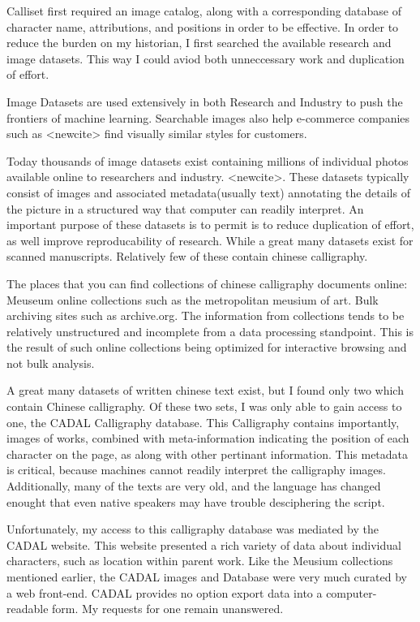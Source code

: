 
Calliset first required an image catalog, along with a corresponding database of character name, attributions, and positions in order to be effective.  In order to reduce the burden on my historian, I first searched the available research and image datasets.  This way I could aviod both unneccessary work and duplication of effort.

Image Datasets are used extensively in both Research and Industry to push the frontiers of machine learning.  Searchable images also help e-commerce companies such as <newcite> find visually similar styles for customers.

Today thousands of image datasets exist containing millions of individual photos available online to researchers and industry.  <newcite>.  These datasets typically consist of images and associated metadata(usually text) annotating the details of the picture in a structured way that computer can readily interpret.  An important purpose of these datasets is to permit is to reduce duplication of effort, as well improve reproducability of research.  While a great many datasets exist for scanned manuscripts.  Relatively few of these contain chinese calligraphy.

The places that you can find collections of chinese calligraphy documents online:  Meuseum online collections such as the metropolitan meusium of art.  Bulk archiving sites such as archive.org.  The information from collections tends to be relatively unstructured and incomplete from a data processing standpoint.  This is the result of such online collections being optimized for interactive browsing and not bulk analysis.

A great many datasets of written chinese text exist, but I found only two which contain Chinese calligraphy.  Of these two sets, I was only able to gain access to one, the CADAL Calligraphy database.  This Calligraphy contains importantly, images of works, combined with meta-information indicating the position of each character on the page, as along with other pertinant information.  This metadata is critical, because machines cannot readily interpret the calligraphy images.  Additionally, many of the texts are very old, and the language has changed enought that even native speakers may have trouble desciphering the script.

Unfortunately, my access to this calligraphy database was mediated by the CADAL website.  This website presented a rich variety of data about individual characters, such as location within parent work.  Like the Meusium collections mentioned earlier, the CADAL images and Database were very much curated by a web front-end.  CADAL provides no option export data into a computer-readable form.  My requests for one remain unanswered.

